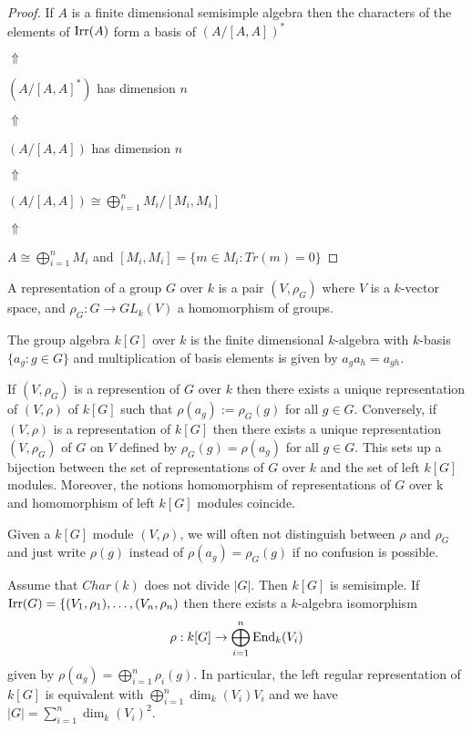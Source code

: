 \begin{proof}
If \(A\) is a finite dimensional semisimple algebra then the characters of the elements of \(\operatorname{Irr}(A)\) form a basis of \((A/[A,A])^*\)

\(\Uparrow \)

\((A/[A,A]^*)\) has dimension \(n\)

\(\Uparrow \)

\((A/[A,A])\) has dimension \(n\)

\(\Uparrow \)

\((A/[A,A]) \cong  \bigoplus_{i=1}^n M_{i}/[M_{i},M_{i}]\)

\(\Uparrow \)

\(A\cong \bigoplus_{i=1}^n M_{i}\) and \([M_{i},M_{i}]=\{m\in M_{i} : Tr(m)=0\}\)
\end{proof}

\begin{defn}
A representation of a group \(G\) over \(k\) is a pair \((V,\rho _G)\) where \(V\) is a \(k\)-vector space, and \(\rho _G: G\rightarrow GL_{k}(V)\) a homomorphism of groups.
\end{defn}

\begin{defn}
The group algebra \(k[G]\) over \(k\) is the finite dimensional \(k\)-algebra with \(k\)-basis \(\{a_{g}:g\in G\}\) and multiplication of basis elements is given by \(a_{g}a_{h}=a_{gh}.\)
\end{defn}

\begin{thm}
If \((V,\rho _G)\) is a represention of \(G\) over \(k\) then there exists a unique representation of \((V,\rho )\) of \(k[G]\) such that \(\rho (a_{g}):=\rho _G(g)\) for all \(g\in G.\) Conversely, if \((V,\rho )\) is a representation of \(k[G]\) then there exists a unique representation \((V,\rho _G)\) of \(G\) on \(V\) defined by \(\rho _G(g)=\rho (a_{g})\) for all \(g\in G.\) This sets up a bijection between the set of representations of \(G\) over \(k\) and the set of left \(k[G]\) modules. Moreover, the notions homomorphism of representations of \(G\) over k and homomorphism of left \(k[G]\) modules coincide.
\end{thm}

\begin{defn}
Given a \(k[G]\) module \((V,\rho )\), we will often not distinguish between \(\rho \) and \(\rho _G\) and just write \(\rho (g)\) instead of \(\rho (a_{g})=\rho _G(g)\) if no confusion is possible.
\end{defn}

\begin{thm}
Assume that \(Char(k)\) does not divide \(|G|\). Then \(k[G]\) is semisimple. If \(\operatorname{Irr}(G)=\{(V_{1},\rho _{1}),\ldots ,(V_{n},\rho _{n})\) then there exists a \(k\)-algebra isomorphism
\[
\rho :k[G]\rightarrow \bigoplus_{i=1}^n \operatorname{End}_{k}(V_{i})
\]
given by \(\rho (a_{g})=\bigoplus_{i=1}^n\rho _{i}(g).\) In particular, the left regular representation of \(k[G]\) is equivalent with \(\bigoplus_{i=1}^n \dim_{k}(V_{i})V_{i}\) and we have \(|G|=\sum _{i=1}^n\dim_{k}(V_{i})^2.\)
\end{thm}

